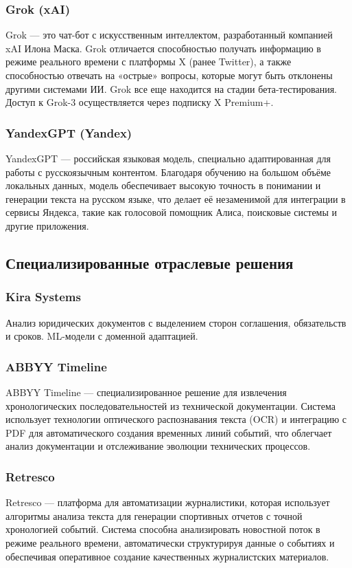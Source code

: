 \subsubsection{Grok (xAI)}
Grok — это чат-бот с искусственным интеллектом, разработанный компанией xAI Илона Маска. Grok отличается способностью получать информацию в режиме реального времени с платформы X (ранее Twitter), а также способностью отвечать на «острые» вопросы, которые могут быть отклонены другими системами ИИ. Grok все еще находится на стадии бета-тестирования. Доступ к Grok-3 осуществляется через подписку X Premium+.


\subsubsection{YandexGPT (Yandex)}
YandexGPT — российская языковая модель, специально адаптированная для работы с русскоязычным контентом. Благодаря обучению на большом объёме локальных данных, модель обеспечивает высокую точность в понимании и генерации текста на русском языке, что делает её незаменимой для интеграции в сервисы Яндекса, такие как голосовой помощник Алиса, поисковые системы и другие приложения.

\subsection{Специализированные отраслевые решения}

\subsubsection{Kira Systems}
Анализ юридических документов с выделением сторон соглашения, обязательств и сроков. ML-модели с доменной адаптацией.

\subsubsection{ABBYY Timeline}
ABBYY Timeline — специализированное решение для извлечения хронологических последовательностей из технической документации. Система использует технологии оптического распознавания текста (OCR) и интеграцию с PDF для автоматического создания временных линий событий, что облегчает анализ документации и отслеживание эволюции технических процессов.

\subsubsection{Retresco}
Retresco — платформа для автоматизации журналистики, которая использует алгоритмы анализа текста для генерации спортивных отчетов с точной хронологией событий. Система способна анализировать новостной поток в режиме реального времени, автоматически структурируя данные о событиях и обеспечивая оперативное создание качественных журналистских материалов.

